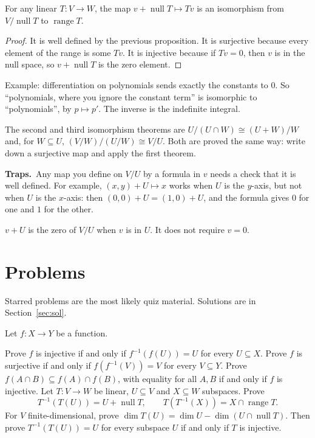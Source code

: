 \documentclass[11pt]{scrartcl}
\DeclareMathOperator{\nul}{null}
\DeclareMathOperator{\range}{range}
\newcommand{\traps}{\par\medskip\noindent\textbf{\color{RawSienna}Traps.}\ }
\begin{document}
\begin{theorem*}
  For any linear $T\colon V\to W$, the map $v+\nul T\mapsto Tv$ is an isomorphism from $V/\nul T$ to $\range T$.
\end{theorem*}
\begin{proof}
  It is well defined by the previous proposition.
  It is surjective because every element of the range is some $Tv$.
  It is injective because if $Tv=0$, then $v$ is in the null space, so $v+\nul T$ is the zero element.
\end{proof}
Example: differentiation on polynomials sends exactly the constants to $0$. So ``polynomials, where you ignore the constant term'' is isomorphic to ``polynomials'', by $p\mapsto p'$. The inverse is the indefinite integral.

The second and third isomorphism theorems are $U/(U\cap W)\cong(U+W)/W$ and, for $W\subseteq U$, $(V/W)/(U/W)\cong V/U$. Both are proved the same way: write down a surjective map and apply the first theorem.

\traps Any map you define on $V/U$ by a formula in $v$ needs a check that it is well defined.
For example, $(x,y)+U\mapsto x$ works when $U$ is the $y$-axis, but not when $U$ is the $x$-axis: then $(0,0)+U=(1,0)+U$, and the formula gives $0$ for one and $1$ for the other.

$v+U$ is the zero of $V/U$ when $v$ is in $U$. It does not require $v=0$.

\section{Problems}
Starred problems are the most likely quiz material. Solutions are in Section~\ref{sec:sol}.

\begin{problem}
  Let $f\colon X\to Y$ be a function.
  \begin{enumerate}[(a)]
    \ii Prove $f$ is injective if and only if $f^{-1}(f(U))=U$ for every $U\subseteq X$.
    \ii Prove $f$ is surjective if and only if $f(f^{-1}(V))=V$ for every $V\subseteq Y$.
    \ii Prove $f(A\cap B)\subseteq f(A)\cap f(B)$, with equality for all $A,B$ if and only if $f$ is injective.
    \ii Let $T\colon V\to W$ be linear, $U\subseteq V$ and $X\subseteq W$ subspaces. Prove
    \[ T^{-1}(T(U))=U+\nul T, \qquad T(T^{-1}(X))=X\cap\range T. \]
    \ii For $V$ finite-dimensional, prove $\dim T(U)=\dim U-\dim(U\cap\nul T)$.
    Then prove $T^{-1}(T(U))=U$ for every subspace $U$ if and only if $T$ is injective.
  \end{enumerate}
\end{problem}
\end{document}
